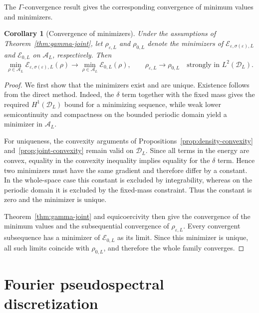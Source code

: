 \documentclass[11pt]{article}
\newcommand{\A}{\mathcal{A}}
\newcommand{\E}{\mathcal{E}}
\newcommand{\eps}{\varepsilon}
\newcommand{\sig}{\sigma}
\theoremstyle{plain}
\newtheorem{corollary}[theorem]{Corollary}
\theoremstyle{definition}
\numberwithin{equation}{section}
\begin{document}
The $\Gamma$-convergence result gives the corresponding convergence
of minimum values and minimizers.

\begin{corollary}[Convergence of minimizers]
\label{cor:min-conv}
Under the assumptions of Theorem~\ref{thm:gamma-joint}, let
$\rho_{\eps,L}$ and $\rho_{0,L}$ denote the minimizers of
$\E_{\eps,\sig(\eps),L}$ and $\E_{0,L}$ on $\A_L$, respectively.
Then
\begin{equation}
\label{eq:minimizer-convergence}
\min_{\rho\in\A_L}\E_{\eps,\sig(\eps),L}(\rho)
\longrightarrow
\min_{\rho\in\A_L}\E_{0,L}(\rho),
\qquad
\rho_{\eps,L}
\longrightarrow
\rho_{0,L}
\quad\text{strongly in }L^2(\mathcal D_L).
\end{equation}
\end{corollary}

\begin{proof}
We first show that the minimizers exist and are unique.
Existence follows from the direct method. Indeed, the $\delta$ term
together with the fixed mass gives the required $H^1(\mathcal D_L)$
bound for a minimizing sequence, while weak lower semicontinuity and
compactness on the bounded periodic domain yield a minimizer in
$\A_L$.

For uniqueness, the convexity arguments of
Propositions~\ref{prop:density-convexity} and~\ref{prop:joint-convexity}
remain valid on $\mathcal D_L$. Since all terms in the energy are
convex, equality in the convexity inequality implies equality for the
$\delta$ term. Hence two minimizers must have the same gradient and
therefore differ by a constant. In the whole-space case this constant
is excluded by integrability, whereas on the periodic domain it is
excluded by the fixed-mass constraint. Thus the constant is zero and
the minimizer is unique.

Theorem~\ref{thm:gamma-joint} and equicoercivity then give the
convergence of the minimum values and the subsequential convergence of
$\rho_{\eps,L}$. Every convergent subsequence has a minimizer of
$\E_{0,L}$ as its limit. Since this minimizer is unique, all such
limits coincide with $\rho_{0,L}$, and therefore the whole family
converges.
\end{proof}

\section{Fourier pseudospectral discretization}
\label{sec:ps}
\end{document}
